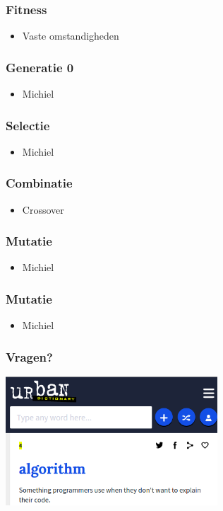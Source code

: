 \documentclass{beamer}
\begin{document}
\begin{frame}
  \frametitle{Fitness}
  \begin{itemize}
      \item Vaste omstandigheden
  \end{itemize}
\end{frame}

\begin{frame}
  \frametitle{Generatie 0}
  \begin{itemize}
      \item Michiel
  \end{itemize}
\end{frame}

\begin{frame}
  \frametitle{Selectie}
  \begin{itemize}
      \item Michiel
  \end{itemize}
\end{frame}

\begin{frame}
  \frametitle{Combinatie}
  \begin{itemize}
      \item Crossover
  \end{itemize}
\end{frame}

\begin{frame}
  \frametitle{Mutatie}
  \begin{itemize}
      \item Michiel
  \end{itemize}
\end{frame}

\begin{frame}
  \frametitle{Mutatie}
  \begin{itemize}
      \item Michiel
  \end{itemize}
\end{frame}

\begin{frame}
  \frametitle{Vragen?}
  \includegraphics[width=300px]{algorithm.png}
\end{frame}
\end{document}
